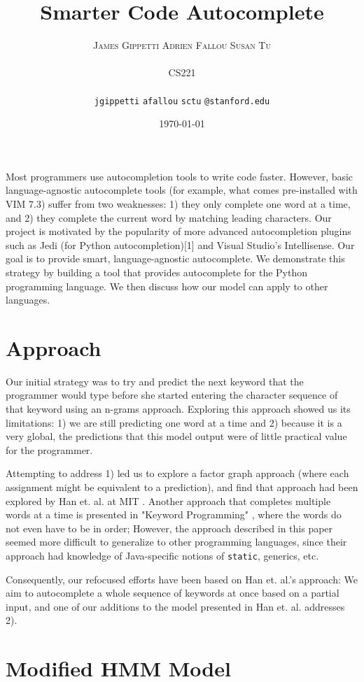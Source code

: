 \documentclass[10pt]{article}
\title{Smarter Code Autocomplete}
\author{
    \textsc{James Gippetti}
        \qquad
    \textsc{Adrien Fallou}
        \qquad
    \textsc{Susan Tu}
        \mbox{}\\ %
        \\
        CS221\\
        \mbox{}\\ %
        \normalsize
            \texttt{jgippetti}
        \textbar{}
            \texttt{afallou}
        \textbar{}
            \texttt{sctu}
        \normalsize
            \texttt{@stanford.edu}
}
\date{\today}
\begin{document}
\maketitle

		Most programmers use autocompletion tools to write code faster. However, basic language-agnostic autocomplete tools (for example, what comes pre-installed with VIM 7.3) suffer from two weaknesses: 1) they only complete one word at a time, and 2) they complete the current word by matching leading characters. Our project is motivated by the popularity of more advanced autocompletion plugins such as Jedi (for Python autocompletion)[1] and Visual Studio’s Intellisense. Our goal is to provide smart, language-agnostic autocomplete. We demonstrate this strategy by building a tool that provides autocomplete for the Python programming language. We then discuss how our model can apply to other languages.

\section{Approach}
 
		Our initial strategy was to try and predict the next keyword that the programmer would type before she started entering the character sequence of that keyword using an n-grams approach. Exploring this approach showed us its limitations: 1) we are still predicting one word at a time and 2) because it is a very global, the predictions that this model output were of little practical value for the programmer.
        
        Attempting to address 1) led us to explore a factor graph approach (where each assignment might be equivalent to a prediction), and find that approach had been explored by Han et. al. at MIT \cite{han}. Another approach that completes multiple words at a time is presented in "Keyword Programming" \cite{little}, where the words do not even have to be in order; However, the approach described in this paper seemed more difficult to generalize to other programming languages, since their approach had knowledge of Java-specific notions of \texttt{static}, generics, etc.

	Consequently, our refocused efforts have been based on Han et. al.'s approach: We aim to autocomplete a whole sequence of keywords at once based on a partial input, and one of our additions to the model presented in Han et. al. addresses 2).

\section{Modified HMM Model}
\end{document}
